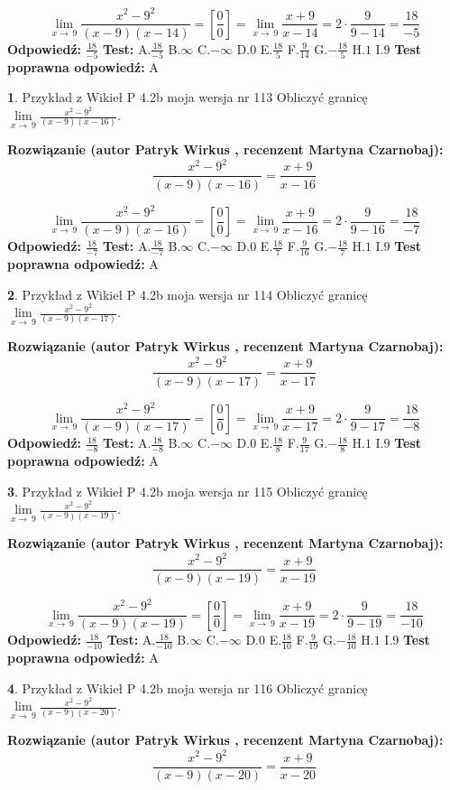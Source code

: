 \documentclass[12pt, a4paper]{article}
\theoremstyle{definition} %
\newtheorem{zad}{}
\newcommand{\zadStart}[1]{\begin{zad}#1\newline}
\newcommand{\zadStop}{\end{zad}}
\newcommand{\rozwStart}[2]{\noindent \textbf{Rozwiązanie (autor #1 , recenzent #2): }\newline}
\newcommand{\rozwStop}{\newline}
\newcommand{\odpStart}{\noindent \textbf{Odpowiedź:}\newline}
\newcommand{\odpStop}{\newline}
\newcommand{\testStart}{\noindent \textbf{Test:}\newline}
\newcommand{\testStop}{\newline}
\newcommand{\kluczStart}{\noindent \textbf{Test poprawna odpowiedź:}\newline}
\newcommand{\kluczStop}{\newline}
\begin{document}
$$\lim\limits_{x\to\ 9}\frac{x^{2}-9^{2}}{(x-9)(x-14)}=[\frac{0}{0}]=\lim\limits_{x\to\ 9}\frac{x+9}{x-14}=2 \cdot \frac{9}{9-14} = \frac{18}{-5}$$
\rozwStop
\odpStart
$\frac{18}{-5}$
\odpStop
\testStart
A.$\frac{18}{-5}$
B.$\infty$
C.$-\infty$
D.$0$
E.$\frac{18}{5}$
F.$\frac{9}{14}$
G.$-\frac{18}{5}$
H.$1$
I.$9$
\testStop
\kluczStart
A
\kluczStop



\zadStart{Przykład z Wikieł P 4.2b moja wersja nr 113}
Obliczyć granicę $\lim\limits_{x\to\ 9}\frac{x^{2}-9^{2}}{(x-9)(x-16)}$.
\zadStop
\rozwStart{Patryk Wirkus}{Martyna Czarnobaj}
$$\frac{x^{2}-9^{2}}{(x-9)(x-16)}=\frac{x+9}{x-16}$$

$$\lim\limits_{x\to\ 9}\frac{x^{2}-9^{2}}{(x-9)(x-16)}=[\frac{0}{0}]=\lim\limits_{x\to\ 9}\frac{x+9}{x-16}=2 \cdot \frac{9}{9-16} = \frac{18}{-7}$$
\rozwStop
\odpStart
$\frac{18}{-7}$
\odpStop
\testStart
A.$\frac{18}{-7}$
B.$\infty$
C.$-\infty$
D.$0$
E.$\frac{18}{7}$
F.$\frac{9}{16}$
G.$-\frac{18}{7}$
H.$1$
I.$9$
\testStop
\kluczStart
A
\kluczStop



\zadStart{Przykład z Wikieł P 4.2b moja wersja nr 114}
Obliczyć granicę $\lim\limits_{x\to\ 9}\frac{x^{2}-9^{2}}{(x-9)(x-17)}$.
\zadStop
\rozwStart{Patryk Wirkus}{Martyna Czarnobaj}
$$\frac{x^{2}-9^{2}}{(x-9)(x-17)}=\frac{x+9}{x-17}$$

$$\lim\limits_{x\to\ 9}\frac{x^{2}-9^{2}}{(x-9)(x-17)}=[\frac{0}{0}]=\lim\limits_{x\to\ 9}\frac{x+9}{x-17}=2 \cdot \frac{9}{9-17} = \frac{18}{-8}$$
\rozwStop
\odpStart
$\frac{18}{-8}$
\odpStop
\testStart
A.$\frac{18}{-8}$
B.$\infty$
C.$-\infty$
D.$0$
E.$\frac{18}{8}$
F.$\frac{9}{17}$
G.$-\frac{18}{8}$
H.$1$
I.$9$
\testStop
\kluczStart
A
\kluczStop



\zadStart{Przykład z Wikieł P 4.2b moja wersja nr 115}
Obliczyć granicę $\lim\limits_{x\to\ 9}\frac{x^{2}-9^{2}}{(x-9)(x-19)}$.
\zadStop
\rozwStart{Patryk Wirkus}{Martyna Czarnobaj}
$$\frac{x^{2}-9^{2}}{(x-9)(x-19)}=\frac{x+9}{x-19}$$

$$\lim\limits_{x\to\ 9}\frac{x^{2}-9^{2}}{(x-9)(x-19)}=[\frac{0}{0}]=\lim\limits_{x\to\ 9}\frac{x+9}{x-19}=2 \cdot \frac{9}{9-19} = \frac{18}{-10}$$
\rozwStop
\odpStart
$\frac{18}{-10}$
\odpStop
\testStart
A.$\frac{18}{-10}$
B.$\infty$
C.$-\infty$
D.$0$
E.$\frac{18}{10}$
F.$\frac{9}{19}$
G.$-\frac{18}{10}$
H.$1$
I.$9$
\testStop
\kluczStart
A
\kluczStop



\zadStart{Przykład z Wikieł P 4.2b moja wersja nr 116}
Obliczyć granicę $\lim\limits_{x\to\ 9}\frac{x^{2}-9^{2}}{(x-9)(x-20)}$.
\zadStop
\rozwStart{Patryk Wirkus}{Martyna Czarnobaj}
$$\frac{x^{2}-9^{2}}{(x-9)(x-20)}=\frac{x+9}{x-20}$$
\end{document}
